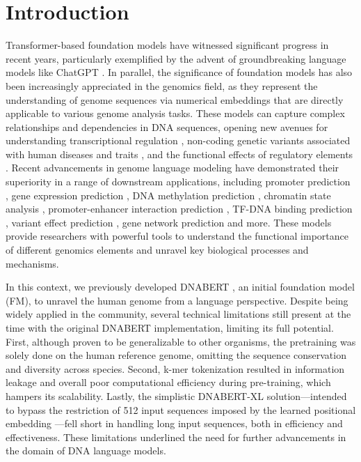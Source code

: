 \documentclass{article}
\begin{document}
\section{Introduction}
\label{sec:intro}

Transformer-based foundation models \citep{foundation_models, bert, gpt4} have witnessed significant progress in recent years, particularly exemplified by the advent of groundbreaking language models like ChatGPT \citep{instructGPT, gpt4}. In parallel, the significance of foundation models has also been increasingly appreciated in the genomics field, as they represent the understanding of genome sequences via numerical embeddings that are directly applicable to various genome analysis tasks. These models can capture complex relationships and dependencies in DNA sequences, opening new avenues for understanding transcriptional regulation \citep{LI2023100384}, non-coding genetic variants associated with human diseases and traits \citep{Rozowsky2023-hl}, and the functional effects of regulatory elements \citep{Smith2023-pg}. Recent advancements in genome language modeling have demonstrated their superiority in a range of downstream applications, including promoter prediction \citep{bertpromoter, iPro-WAEL}, gene expression prediction \citep{enformer}, DNA methylation prediction \citep{Jin2022-bx}, chromatin state analysis \citep{lee2022learning_chromatin}, promoter-enhancer interaction prediction \citep{Chen2022-yh, Ni2022-ck}, TF-DNA binding prediction \citep{tfdna}, variant effect prediction \citep{Rozowsky2023-hl}, gene network prediction \citep{Theodoris2023-kc} and more. These models provide researchers with powerful tools to understand the functional importance of different genomics elements and unravel key biological processes and mechanisms.

In this context, we previously developed DNABERT \citep{dnabert}, an initial foundation model (FM), to unravel the human genome from a language perspective. Despite being widely applied in the community, several technical limitations still present at the time with the original DNABERT implementation, limiting its full potential. First, although proven to be generalizable to other organisms, the pretraining was solely done on the human reference genome, omitting the sequence conservation and diversity across species. Second, k-mer tokenization resulted in information leakage and overall poor computational efficiency during pre-training, which hampers its scalability. Lastly, the simplistic DNABERT-XL solution—intended to bypass the restriction of 512 input sequences imposed by the learned positional embedding \citep{bert}—fell short in handling long input sequences, both in efficiency and effectiveness. These limitations underlined the need for further advancements in the domain of DNA language models.
\end{document}

